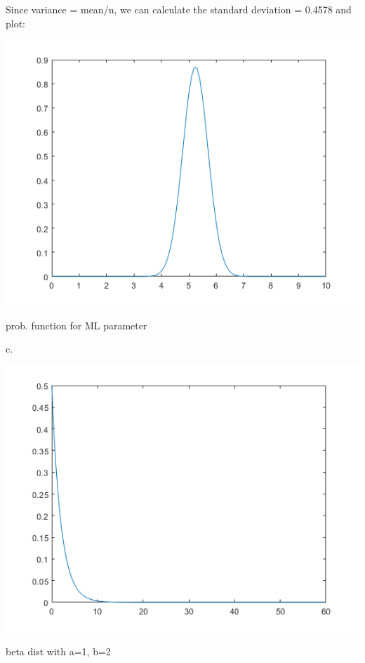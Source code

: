 \documentclass[a4paper]{article}
\begin{document}
Since variance = mean/n, we can calculate the standard deviation = 0.4578 and plot:

\begin{center}
    \includegraphics[scale=1]{2b.png}
    \caption{prob. function for ML parameter}
\end{center}

c. 

\begin{center}
    \includegraphics[scale=1]{2c-1.png}
    \caption{beta dist with a=1, b=2}
\end{center}
\end{document}
